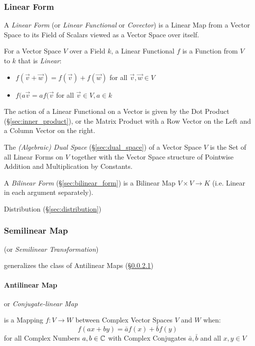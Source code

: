 \subsubsection{Linear Form}\label{sec:linear_form}

A \emph{Linear Form} (or \emph{Linear Functional} or \emph{Covector}) is a
Linear Map from a Vector Space to its Field of Scalars viewed as a Vector Space
over itself.

For a Vector Space $V$ over a Field $k$, a Linear Functional $f$ is a Function
from $V$ to $k$ that is \emph{Linear}:
\begin{itemize}
\item $f(\vec{v} + \vec{w}) = f(\vec{v}) + f(\vec{w})$ for all $\vec{v},
  \vec{w} \in V$
\item $f(a\vec{v} = af(\vec{v}$ for all $\vec{v} \in V, a \in k$
\end{itemize}

The action of a Linear Functional on a Vector is given by the Dot Product
(\S\ref{sec:inner_product}), or the Matrix Product with a Row Vector on the
Left and a Column Vector on the right.

The \emph{(Algebraic) Dual Space} (\S\ref{sec:dual_space}) of a Vector Space
$V$ is the Set of all Linear Forms on $V$ together with the Vector Space
structure of Pointwise Addition and Multiplication by Constants.

A \emph{Bilinear Form} (\S\ref{sec:bilinear_form}) is a Bilinear Map $V \times
V \rightarrow K$ (i.e. Linear in each argument separately).

Distribution (\S\ref{sec:distribution})



\subsubsection{Semilinear Map}\label{sec:semilinear_map}

(or \emph{Semilinear Transformation})

generalizes the class of Antilinear Maps (\S\ref{sec:antilinear_map})



\paragraph{Antilinear Map}\label{sec:antilinear_map}\hfill

or \emph{Conjugate-linear Map}

is a Mapping $f : V \rightarrow W$ between Complex Vector Spaces $V$ and $W$
when:
\[
  f (ax+by) = \bar{a}f(x) + \bar{b}f(y)
\]
for all Complex Numbers $a,b \in \mathbb{C}$ with Complex Conjugates $\bar{a},
\bar{b}$ and all $x,y \in V$

